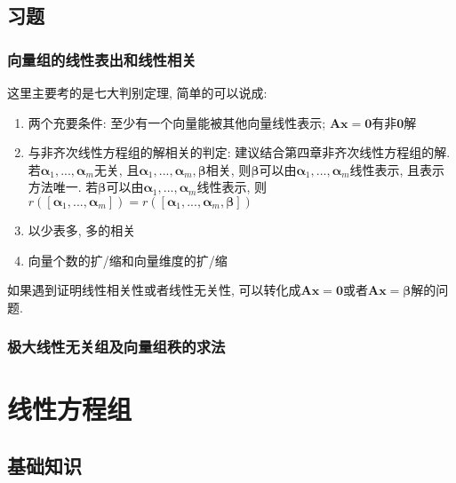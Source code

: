 \section{习题}
\subsection{向量组的线性表出和线性相关}
这里主要考的是七大判别定理, 简单的可以说成:
\begin{enumerate}
\item 两个充要条件: 至少有一个向量能被其他向量线性表示; $ \bm{A}\bm{x}=\bm{0} $有非$ \bm{0} $解
\item 与非齐次线性方程组的解相关的判定: 建议结合第四章非齐次线性方程组的解. 若$ \bm{\alpha}_{1},...,\bm{\alpha}_{m} $无关, 且$ \bm{\alpha}_{1},...,\bm{\alpha}_{m},\bm{\beta} $相关, 则$ \bm{\beta} $可以由$ \bm{\alpha}_{1},...,\bm{\alpha}_{m} $线性表示, 且表示方法唯一. 若$ \bm{\beta} $可以由$ \bm{\alpha}_{1},...,\bm{\alpha}_{m} $线性表示, 则$ r([\bm{\alpha}_{1},...,\bm{\alpha}_{m}])=r([\bm{\alpha}_{1},...,\bm{\alpha}_{m},\bm{\beta}]) $
\item 以少表多, 多的相关
\item 向量个数的扩/缩和向量维度的扩/缩
\end{enumerate}\par 
如果遇到证明线性相关性或者线性无关性, 可以转化成$ \bm{A}\bm{x}=\bm{0} $或者$ \bm{A}\bm{x}=\bm{\beta} $解的问题.
\subsection{极大线性无关组及向量组秩的求法}

\chapter{线性方程组}
\section{基础知识}
